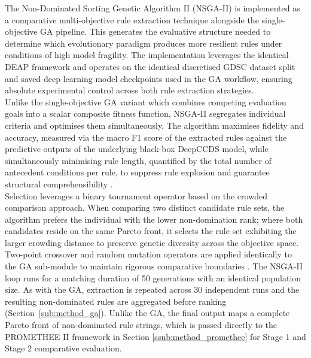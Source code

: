 \label{sub:method_nsga}
The Non-Dominated Sorting Genetic Algorithm II (NSGA-II) is implemented as a 
comparative multi-objective rule extraction technique alongside the single-objective 
GA pipeline. This generates the evaluative structure needed to determine which 
evolutionary paradigm produces more resilient rules under conditions of high model 
fragility. The implementation leverages the identical DEAP framework and operates 
on the identical discretised GDSC dataset split and saved deep learning model checkpoints 
used in the GA workflow, ensuring absolute experimental control across both rule 
extraction strategies.
\\
Unlike the single-objective GA variant which combines competing evaluation goals into 
a scalar composite fitness function, NSGA-II segregates individual criteria and 
optimises them simultaneously. The algorithm maximises fidelity and accuracy, 
measured via the macro F1 score of the extracted rules against the predictive outputs 
of the underlying black-box DeepCCDS model, while simultaneously minimising rule 
length, quantified by the total number of antecedent conditions per rule, to suppress 
rule explosion and guarantee structural comprehensibility \cite{Yedjour2024}.
\\
Selection leverages a binary tournament operator based on the crowded comparison 
approach. When comparing two distinct candidate rule sets, the algorithm prefers the 
individual with the lower non-domination rank; where both candidates reside on the 
same Pareto front, it selects the rule set exhibiting the larger crowding distance to 
preserve genetic diversity across the objective space. 
\\
Two-point crossover and random mutation operators are applied identically to the GA 
sub-module to maintain rigorous comparative boundaries \cite{Yedjour2024}. The 
NSGA-II loop runs for a matching duration of 50 generations with an identical population 
size. As with the GA, extraction is repeated across 30 independent runs and the resulting
non-dominated rules are aggregated before ranking (Section~\ref{sub:method_ga}). Unlike the GA, the
final output maps a complete Pareto front of non-dominated
rule strings, which is passed directly to the PROMETHEE II framework in Section 
\ref{ssub:method_promethee} for Stage 1 and Stage 2 comparative evaluation.
